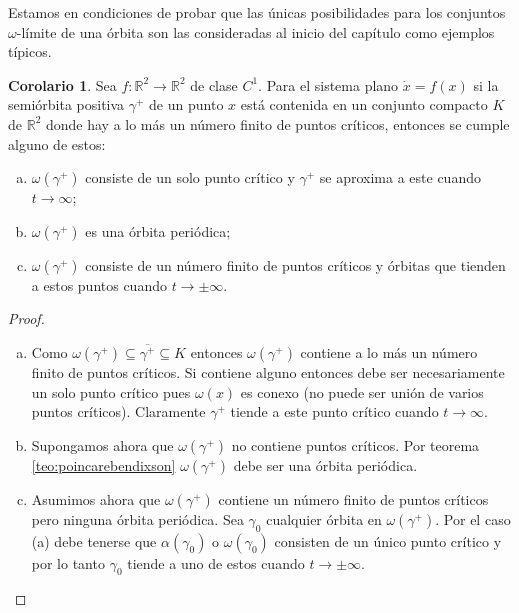 \documentclass[11pt]{book}
\theoremstyle{definition}
\numberwithin{definition}{section}
\theoremstyle{theorem}
\newtheorem{corollary}{Corolario}
\numberwithin{theorem}{section}
\numberwithin{lemma}{section}
\numberwithin{corollary}{section}
\theoremstyle{plain}
\numberwithin{example}{section}
\newcommand{\R}{{\ensuremath{\mathbb{R}}}}
\begin{document}
Estamos en condiciones de probar que las únicas posibilidades para los conjuntos $\omega$-límite de una órbita son las consideradas al inicio del capítulo como ejemplos típicos.

\begin{corollary} \label{teo:poincarebendixson2} Sea $f: \R^2 \to \R^2$ de clase $C^1$. Para el sistema plano $\dot{x} = f(x)$ si la semiórbita positiva $\gamma^+$ de un punto $x$ está contenida en un conjunto compacto $K$ de $\R^2$ donde hay a lo más un número finito de puntos críticos, entonces se cumple alguno de estos:

	\begin{enumerate}[(a)]
		\item $\omega(\gamma^+)$ consiste de un solo punto crítico  y $\gamma^+$ se aproxima a este cuando $t \to \infty$;
		\item $\omega(\gamma^+)$ es una órbita periódica;
		\item $\omega(\gamma^+)$ consiste de un número finito de puntos críticos y órbitas que tienden a estos puntos cuando $t \to \pm \infty$.
	\end{enumerate}
\end{corollary}

\begin{proof}
\begin{enumerate}[(a)]
	\item Como $\omega(\gamma^+) \subseteq \overline{\gamma^+} \subseteq K$ entonces $\omega(\gamma^+)$ contiene a lo más un número finito de puntos críticos. Si contiene alguno entonces debe ser necesariamente un solo punto crítico pues $\omega(x)$ es conexo (no puede ser unión de varios puntos críticos). Claramente $\gamma^+$ tiende a este punto crítico cuando $t \to \infty$.
	\item Supongamos ahora que $\omega(\gamma^+)$ no contiene puntos críticos. Por teorema \ref{teo:poincarebendixson} $\omega(\gamma^+)$ debe ser una órbita periódica.
	\item Asumimos ahora que $\omega(\gamma^+)$ contiene un número finito de puntos críticos pero ninguna órbita periódica. Sea $\gamma_0$ cualquier órbita en $\omega(\gamma^+)$. Por el caso (a) debe tenerse que $\alpha(\gamma_0)$ o $\omega(\gamma_0)$ consisten de un único punto crítico y por lo tanto $\gamma_0$ tiende a uno de estos cuando $t \to \pm \infty$.
\end{enumerate}
\end{proof}

\end{document}
